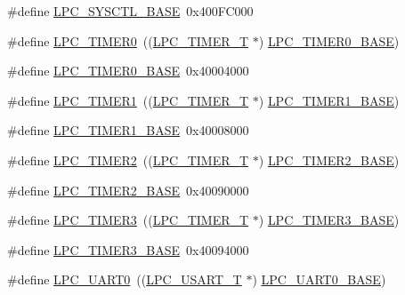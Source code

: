 \begin{DoxyCompactItemize}
\item 
\#define \hyperlink{group__PERIPH__175X__6X__BASE_gae4670b50fe27772fa31de1da10bec7b7}{L\+P\+C\+\_\+\+S\+Y\+S\+C\+T\+L\+\_\+\+B\+A\+SE}~0x400\+F\+C000
\item 
\#define \hyperlink{group__PERIPH__175X__6X__BASE_ga800f32a8a38d9e9c8f3b6ab161f6f2d2}{L\+P\+C\+\_\+\+T\+I\+M\+E\+R0}~((\hyperlink{structLPC__TIMER__T}{L\+P\+C\+\_\+\+T\+I\+M\+E\+R\+\_\+T}            $\ast$) \hyperlink{group__PERIPH__407X__8X__BASE_ga58d2cc2a6a4bd9319853ad5b62a20d43}{L\+P\+C\+\_\+\+T\+I\+M\+E\+R0\+\_\+\+B\+A\+SE})
\item 
\#define \hyperlink{group__PERIPH__175X__6X__BASE_ga58d2cc2a6a4bd9319853ad5b62a20d43}{L\+P\+C\+\_\+\+T\+I\+M\+E\+R0\+\_\+\+B\+A\+SE}~0x40004000
\item 
\#define \hyperlink{group__PERIPH__175X__6X__BASE_ga0d28200f11e877cece24025ebe7fe72a}{L\+P\+C\+\_\+\+T\+I\+M\+E\+R1}~((\hyperlink{structLPC__TIMER__T}{L\+P\+C\+\_\+\+T\+I\+M\+E\+R\+\_\+T}            $\ast$) \hyperlink{group__PERIPH__407X__8X__BASE_ga077e94a95d95d79f6aeb0ea962377c46}{L\+P\+C\+\_\+\+T\+I\+M\+E\+R1\+\_\+\+B\+A\+SE})
\item 
\#define \hyperlink{group__PERIPH__175X__6X__BASE_ga077e94a95d95d79f6aeb0ea962377c46}{L\+P\+C\+\_\+\+T\+I\+M\+E\+R1\+\_\+\+B\+A\+SE}~0x40008000
\item 
\#define \hyperlink{group__PERIPH__175X__6X__BASE_gae0a3c421e7e1ac3ffd7e740e33387dc5}{L\+P\+C\+\_\+\+T\+I\+M\+E\+R2}~((\hyperlink{structLPC__TIMER__T}{L\+P\+C\+\_\+\+T\+I\+M\+E\+R\+\_\+T}            $\ast$) \hyperlink{group__PERIPH__407X__8X__BASE_gab46122134a159b494e060ae3a7be0967}{L\+P\+C\+\_\+\+T\+I\+M\+E\+R2\+\_\+\+B\+A\+SE})
\item 
\#define \hyperlink{group__PERIPH__175X__6X__BASE_gab46122134a159b494e060ae3a7be0967}{L\+P\+C\+\_\+\+T\+I\+M\+E\+R2\+\_\+\+B\+A\+SE}~0x40090000
\item 
\#define \hyperlink{group__PERIPH__175X__6X__BASE_gab34ae64ea250497b5148b7ffb61d04f5}{L\+P\+C\+\_\+\+T\+I\+M\+E\+R3}~((\hyperlink{structLPC__TIMER__T}{L\+P\+C\+\_\+\+T\+I\+M\+E\+R\+\_\+T}            $\ast$) \hyperlink{group__PERIPH__407X__8X__BASE_ga002e95d51eef32473052ea2575440eac}{L\+P\+C\+\_\+\+T\+I\+M\+E\+R3\+\_\+\+B\+A\+SE})
\item 
\#define \hyperlink{group__PERIPH__175X__6X__BASE_ga002e95d51eef32473052ea2575440eac}{L\+P\+C\+\_\+\+T\+I\+M\+E\+R3\+\_\+\+B\+A\+SE}~0x40094000
\item 
\#define \hyperlink{group__PERIPH__175X__6X__BASE_ga6ba29f0f9b8af2f72e303533185bcc82}{L\+P\+C\+\_\+\+U\+A\+R\+T0}~((\hyperlink{structLPC__USART__T}{L\+P\+C\+\_\+\+U\+S\+A\+R\+T\+\_\+T}            $\ast$) \hyperlink{group__PERIPH__407X__8X__BASE_gaa96fb70405a1298b350fc6f0ad0af997}{L\+P\+C\+\_\+\+U\+A\+R\+T0\+\_\+\+B\+A\+SE})

\end{DoxyCompactItemize}
